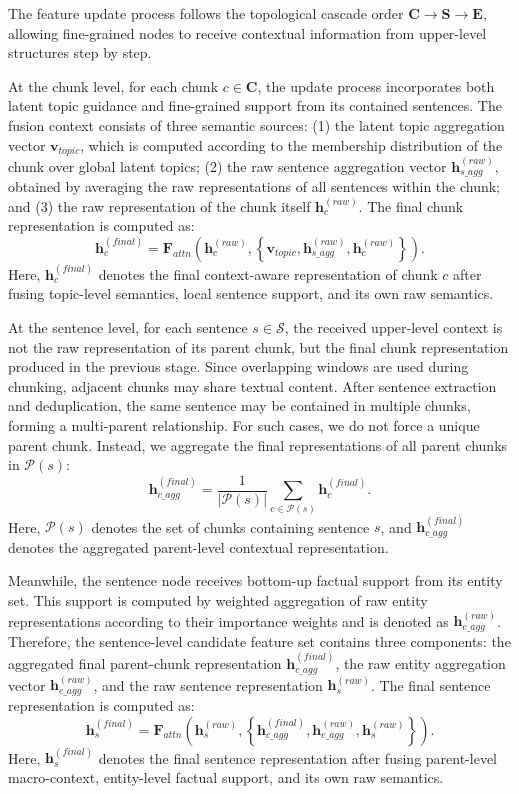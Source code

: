 \documentclass[preprint,12pt]{elsarticle}
\begin{document}
The feature update process follows the topological cascade order $\mathbf{C} \rightarrow \mathbf{S} \rightarrow \mathbf{E}$, allowing fine-grained nodes to receive contextual information from upper-level structures step by step.

At the chunk level, for each chunk $c \in \mathbf{C}$, the update process incorporates both latent topic guidance and fine-grained support from its contained sentences. The fusion context consists of three semantic sources: (1) the latent topic aggregation vector $\mathbf{v}_{topic}$, which is computed according to the membership distribution of the chunk over global latent topics; (2) the raw sentence aggregation vector $\mathbf{h}_{s\_agg}^{(raw)}$, obtained by averaging the raw representations of all sentences within the chunk; and (3) the raw representation of the chunk itself $\mathbf{h}_{c}^{(raw)}$. The final chunk representation is computed as:
\[
\mathbf{h}_{c}^{(final)}
=
\mathbf{F}_{attn}
\left(
\mathbf{h}_{c}^{(raw)},
\left\{
\mathbf{v}_{topic},
\mathbf{h}_{s\_agg}^{(raw)},
\mathbf{h}_{c}^{(raw)}
\right\}
\right).
\]
Here, $\mathbf{h}_{c}^{(final)}$ denotes the final context-aware representation of chunk $c$ after fusing topic-level semantics, local sentence support, and its own raw semantics.

At the sentence level, for each sentence $s \in \mathcal{S}$, the received upper-level context is not the raw representation of its parent chunk, but the final chunk representation produced in the previous stage. Since overlapping windows are used during chunking, adjacent chunks may share textual content. After sentence extraction and deduplication, the same sentence may be contained in multiple chunks, forming a multi-parent relationship. For such cases, we do not force a unique parent chunk. Instead, we aggregate the final representations of all parent chunks in $\mathcal{P}(s)$:
\[
\mathbf{h}_{c\_agg}^{(final)}
=
\frac{1}{|\mathcal{P}(s)|}
\sum_{c \in \mathcal{P}(s)}
\mathbf{h}_{c}^{(final)}.
\]
Here, $\mathcal{P}(s)$ denotes the set of chunks containing sentence $s$, and $\mathbf{h}_{c\_agg}^{(final)}$ denotes the aggregated parent-level contextual representation.

Meanwhile, the sentence node receives bottom-up factual support from its entity set. This support is computed by weighted aggregation of raw entity representations according to their importance weights and is denoted as $\mathbf{h}_{e\_agg}^{(raw)}$. Therefore, the sentence-level candidate feature set contains three components: the aggregated final parent-chunk representation $\mathbf{h}_{c\_agg}^{(final)}$, the raw entity aggregation vector $\mathbf{h}_{e\_agg}^{(raw)}$, and the raw sentence representation $\mathbf{h}_{s}^{(raw)}$. The final sentence representation is computed as:
\[
\mathbf{h}_{s}^{(final)}
=
\mathbf{F}_{attn}
\left(
\mathbf{h}_{s}^{(raw)},
\left\{
\mathbf{h}_{c\_agg}^{(final)},
\mathbf{h}_{e\_agg}^{(raw)},
\mathbf{h}_{s}^{(raw)}
\right\}
\right).
\]
Here, $\mathbf{h}_{s}^{(final)}$ denotes the final sentence representation after fusing parent-level macro-context, entity-level factual support, and its own raw semantics.
\end{document}
